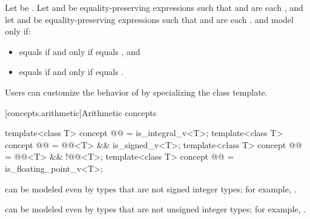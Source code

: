 \begin{itemdescr}
\pnum
Let  be .
Let  and  be
equality-preserving expressions such that
 and  are each , and
let  and  be equality-preserving expressions such that
 and  are each .
 and  model 
only if:
\begin{itemize}
\item {} equals  if and only if
   equals , and
\item {} equals  if and only if
   equals .
\end{itemize}

\pnum
\begin{note}
Users can customize the behavior of  by specializing the
 class template.
\end{note}

\end{itemdescr}

[concepts.arithmetic]{Arithmetic concepts}

\begin{itemdecl}
template<class T>
  concept @@ = is_integral_v<T>;
template<class T>
  concept @@ = @@<T> && is_signed_v<T>;
template<class T>
  concept @@ = @@<T> && !@@<T>;
template<class T>
  concept @@ = is_floating_point_v<T>;
\end{itemdecl}

\begin{itemdescr}
\pnum
\begin{note}
 can be modeled even by types that are
not signed integer types; for example, .
\end{note}

\pnum
\begin{note}
 can be modeled even by types that are
not unsigned integer types; for example, .
\end{note}
\end{itemdescr}

